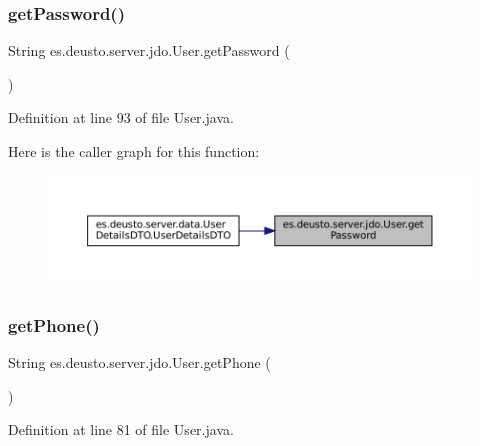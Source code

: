 \subsubsection{\texorpdfstring{getPassword()}{getPassword()}}
{\footnotesize\ttfamily String es.\+deusto.\+server.\+jdo.\+User.\+get\+Password (\begin{DoxyParamCaption}{ }\end{DoxyParamCaption})}



Definition at line 93 of file User.\+java.

Here is the caller graph for this function\+:
\nopagebreak
\begin{figure}[H]
\begin{center}
\leavevmode
\includegraphics[width=350pt]{classes_1_1deusto_1_1server_1_1jdo_1_1_user_a1900ee126da22ed0f043e0077e8be049_icgraph}
\end{center}
\end{figure}
\mbox{\label{classes_1_1deusto_1_1server_1_1jdo_1_1_user_a9ad4609fbf59521908115b9c49d903f4}} 
\subsubsection{\texorpdfstring{getPhone()}{getPhone()}}
{\footnotesize\ttfamily String es.\+deusto.\+server.\+jdo.\+User.\+get\+Phone (\begin{DoxyParamCaption}{ }\end{DoxyParamCaption})}



Definition at line 81 of file User.\+java.

